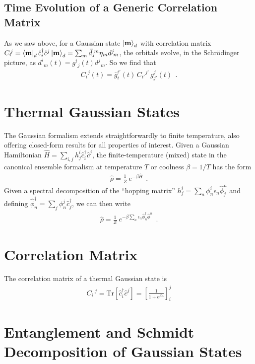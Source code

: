 \documentclass[aps, superscriptaddress, floatfix, onecolumn]{revtex4-2}
\begin{document}
\subsection{Time Evolution of a Generic Correlation Matrix}

As we saw above, for a Gaussian state $\ket{\mathbf{m}}_d$ with correlation matrix $C_i\!^j = \bra{\mathbf{m}}_d \hat{c}^\dagger_i \hat{c}^j \ket{\mathbf{m}}_d = \sum_m \bar{d}_j\!^m \eta_m d^j\!_m$, the orbitals evolve, in the Schr\"odinger picture, as $d^i\!_m(t) = g^i\!_j(t) d^j\!_m$. 
So we find that 
\begin{align}
\boxed{C_i\!^j(t) =  \bar{g}^{i'}_i(t)\, C_{i'}\!^{j'}\, g^j_{j'}(t) } \ \ .
\end{align}


\section{Thermal Gaussian States}

The Gaussian formalism extends straightforwardly to finite temperature, also offering closed-form results for all properties of interest. Given a Gaussian Hamiltonian $\hat{H}= \sum_{i,j} h^i_j \hat{c}^\dagger_i \hat{c}^j$, the finite-temperature (mixed) state in the canonical ensemble formalism at temperature $T$ or coolness $\beta = 1/T$ has the form
\begin{align}
\hat{\rho} = \frac{1}{Z}\ e^{-\beta \hat{H}} \ \ .
\end{align}
Given a spectral decomposition of the ``hopping matrix'' $h^i_j = \sum_n \phi^i_n \epsilon_n \hat{\phi}^n_j$ and defining $\hat{\phi}^\dagger_n = \sum_j \phi^j_n \hat{c}^\dagger_j$, we can then write 
\begin{align}
\hat{\rho} = \frac{1}{Z}\   e^{-\beta \sum_n  \epsilon_n \hat{\phi}^\dagger_n \hat{\phi}^n} \ \ . 
\end{align}

\section{Correlation Matrix}

The correlation matrix of a thermal Gaussian state is 
\begin{align}
    C_i\,^j = \text{Tr}[ \hat{c}^\dagger_i \hat{c}^j ] = \left[ \frac{1}{1+e^{\beta \mathbf{h}}} \right]_i^j 
\end{align}

\section{Entanglement and Schmidt Decomposition of Gaussian States}
\end{document}
